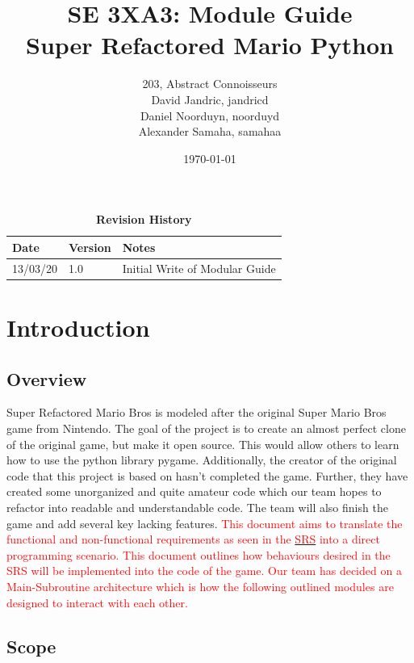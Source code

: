 \documentclass[12pt, titlepage]{article}
\title{SE 3XA3: Module Guide\\Super Refactored Mario Python}
\author{203, Abstract Connoisseurs
		\\ David Jandric, jandricd
		\\ Daniel Noorduyn, noorduyd
		\\ Alexander Samaha, samahaa
}
\date{\today}
\begin{document}
\maketitle

\tableofcontents
\listoftables
\listoffigures

\begin{table}[btp]
\caption{\bf Revision History}
\begin{tabularx}{\textwidth}{p{3cm}p{2cm}X}
\toprule {\bf Date} & {\bf Version} & {\bf Notes}\\
\midrule
13/03/20 & 1.0 & Initial Write of Modular Guide\\
\bottomrule
\end{tabularx}
\end{table}

\clearpage


\section{Introduction}

\subsection{Overview}

Super Refactored Mario Bros is modeled after the original Super Mario Bros game from Nintendo. The goal of the project is to create an almost perfect clone of the original game, but make it open source. This would allow others to learn how to use the python library pygame. Additionally, the creator of the original code that this project is based on hasn't completed the game. Further, they have created some unorganized and quite amateur code which our team hopes to refactor into readable and understandable code. The team will also finish the game and add several key lacking features. \textcolor{red}{This document aims to translate the functional and non-functional requirements as seen in the \href{https://gitlab.cas.mcmaster.ca/jandric/super-refactored-mario-bros/-/blob/master/Doc/SRS/SRS.pdf}{\textcolor{red}{SRS}} into a direct programming scenario. This document outlines how behaviours desired in the SRS will be implemented into the code of the game. Our team has decided on a Main-Subroutine architecture which is how the following outlined modules are designed to interact with each other.}

\subsection{Scope}
\end{document}

